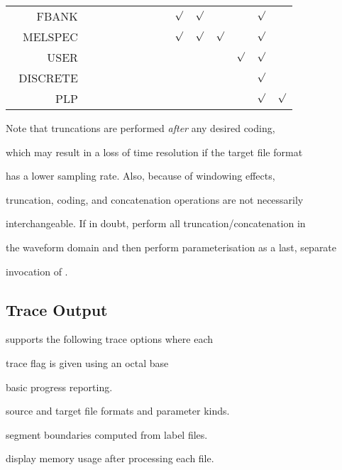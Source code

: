 \begin{center}
\begin{tabular}{|r||ccccccccccc|}
~~~~FBANK & ~ & ~ & ~ &  ~ & ~ & $\surd$ & $\surd$ & ~ & ~ &$\surd$& ~\\


~~MELSPEC & ~ & ~ & ~ &  ~ & ~ & $\surd$ & $\surd$ & $\surd$ & ~ &$\surd$& ~\\


~~~~~USER & ~ & ~ & ~ &  ~ & ~ & ~ & ~ & ~ & $\surd$ &$\surd$ & ~\\


~DISCRETE & ~ & ~ & ~ &  ~ & ~ & ~ & ~ & ~ & ~ & $\surd$ & ~ \\ 


~~~~~~PLP & ~ & ~ & ~ &  ~ & ~ & ~ & ~ & ~ & ~ & $\surd$ & $\surd$ \\ 


\hline


\end{tabular}




\end{center}





Note that truncations are performed {\em after\/} any desired coding,


which may result in a loss of time resolution if the target file format


has a lower sampling rate. Also, because of windowing effects,


truncation, coding, and concatenation operations are not necessarily


interchangeable.  If in doubt, perform all truncation/concatenation in


the waveform domain and then perform parameterisation as a last, separate


invocation of .





\subsection{Trace Output}





 supports the following trace options where each


trace flag is given using an octal base


\begin{optlist}





  basic progress reporting. 


  source and target file formats and parameter kinds.


  segment boundaries computed from label files.


  display memory usage after processing each file.


\end{optlist}


